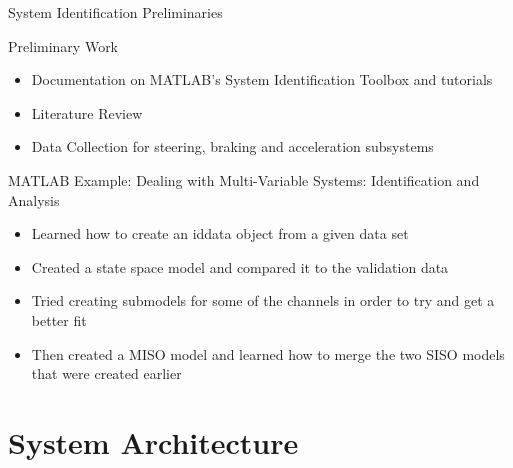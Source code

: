 \documentclass{beamer}
\begin{document}
\begin{frame}{System Identification Preliminaries}{}
  \begin{block}{Preliminary Work}
 \begin{itemize}
        \item Documentation on MATLAB's System Identification Toolbox and tutorials
        \item Literature Review 
        \item Data Collection for steering, braking and acceleration subsystems
\end{itemize}
  \end{block}
  
   \begin {block}{MATLAB Example: Dealing with Multi-Variable Systems: Identification and Analysis}
  \begin{itemize}
  	\item  Learned how to create an iddata object from a given data set 
  	\item Created a state space model and compared it to the validation data 
  	\item Tried creating submodels for some of the channels in order to try and get a better fit 
  	\item Then created a MISO model and learned how to merge the two SISO models that were created earlier 
  	\end{itemize}
  	\end{block}
\end{frame}

%     
%      
\section{System Architecture}
\end{document}
